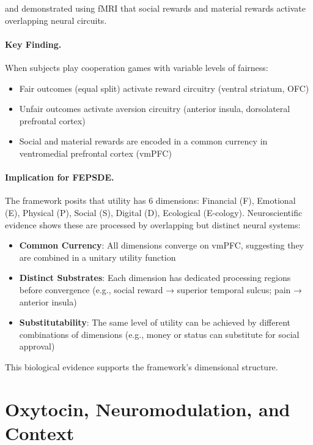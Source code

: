 \documentclass[12pt,oneside]{book}
\begin{document}
\citet{rangelshadcam2008} and \citet{fehrcamerer2007} demonstrated using fMRI that social
rewards and material rewards activate overlapping neural circuits.

\paragraph{Key Finding.}

When subjects play cooperation games with variable levels of fairness:
\begin{itemize}
  \item Fair outcomes (equal split) activate reward circuitry (ventral striatum, OFC)
  \item Unfair outcomes activate aversion circuitry (anterior insula, dorsolateral prefrontal cortex)
  \item Social and material rewards are encoded in a common currency in ventromedial prefrontal cortex (vmPFC)
\end{itemize}

\paragraph{Implication for FEPSDE.}

The framework posits that utility has 6 dimensions: Financial (F), Emotional (E), Physical (P),
Social (S), Digital (D), Ecological (E-cology). Neuroscientific evidence shows these are
processed by overlapping but distinct neural systems:

\begin{itemize}
  \item \textbf{Common Currency}: All dimensions converge on vmPFC, suggesting they are combined
        in a unitary utility function
  \item \textbf{Distinct Substrates}: Each dimension has dedicated processing regions before
        convergence (e.g., social reward → superior temporal sulcus; pain → anterior insula)
  \item \textbf{Substitutability}: The same level of utility can be achieved by different
        combinations of dimensions (e.g., money or status can substitute for social approval)
\end{itemize}

This biological evidence supports the framework's dimensional structure.

\section{Oxytocin, Neuromodulation, and Context}
\end{document}
